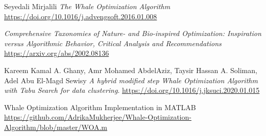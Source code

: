 \documentclass[11pt]{article}
\begin{document}
\begin{thebibliography}{9}

  Seyedali Mirjalili
  \textit{The Whale Optimization Algorithm}
  \url{https://doi.org/10.1016/j.advengsoft.2016.01.008}

  \textit{Comprehensive Taxonomies of Nature- and Bio-inspired Optimization: Inspiration versus Algorithmic Behavior, Critical Analysis and Recommendations}
  \url{https://arxiv.org/abs/2002.08136}


  Kareem Kamal A. Ghany, Amr Mohamed AbdelAziz, Taysir Hassan A. Soliman, Adel Abu El-Magd Sewisy 
  \textit{A hybrid modified step Whale Optimization Algorithm with Tabu Search for data clustering}. 
  \url{https://doi.org/10.1016/j.jksuci.2020.01.015}
  
  Whale Optimization Algorithm Implementation in MATLAB
  \url{https://github.com/AdrikaMukherjee/Whale-Optimization-Algorithm/blob/master/WOA.m}
\end{thebibliography}
\end{document}
